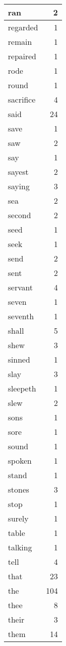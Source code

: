 \begin{center}
\begin{longtable}{l|r}
ran & 2\\ \hline 
regarded & 1\\ \hline 
remain & 1\\ \hline 
repaired & 1\\ \hline 
rode & 1\\ \hline 
round & 1\\ \hline 
sacrifice & 4\\ \hline 
said & 24\\ \hline 
save & 1\\ \hline 
saw & 2\\ \hline 
say & 1\\ \hline 
sayest & 2\\ \hline 
saying & 3\\ \hline 
sea & 2\\ \hline 
second & 2\\ \hline 
seed & 1\\ \hline 
seek & 1\\ \hline 
send & 2\\ \hline 
sent & 2\\ \hline 
servant & 4\\ \hline 
seven & 1\\ \hline 
seventh & 1\\ \hline 
shall & 5\\ \hline 
shew & 3\\ \hline 
sinned & 1\\ \hline 
slay & 3\\ \hline 
sleepeth & 1\\ \hline 
slew & 2\\ \hline 
sons & 1\\ \hline 
sore & 1\\ \hline 
sound & 1\\ \hline 
spoken & 1\\ \hline 
stand & 1\\ \hline 
stones & 3\\ \hline 
stop & 1\\ \hline 
surely & 1\\ \hline 
table & 1\\ \hline 
talking & 1\\ \hline 
tell & 4\\ \hline 
that & 23\\ \hline 
the & 104\\ \hline 
thee & 8\\ \hline 
their & 3\\ \hline 
them & 14\\ \hline 

\end{longtable}
\end{center}
